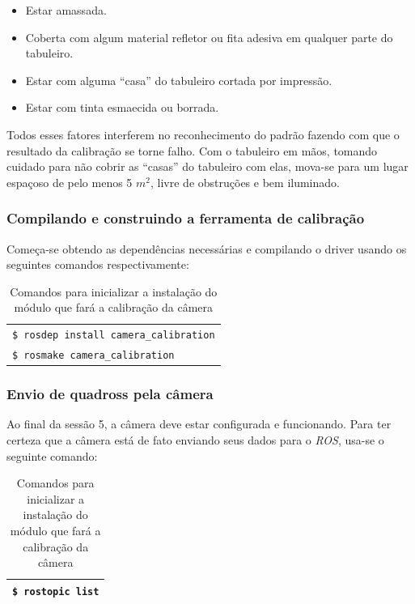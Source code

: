 \begin{itemize}
	\item{Estar amassada.}
	\item{Coberta com algum material refletor ou fita adesiva em qualquer parte do tabuleiro.}
	\item{Estar com alguma “casa” do tabuleiro cortada por impressão.}
	\item{Estar com tinta esmaecida ou borrada.}
\end{itemize}	

Todos esses fatores interferem no reconhecimento do padrão fazendo com que o resultado da calibração se torne falho. Com o tabuleiro em mãos, tomando cuidado para não cobrir as “casas” do tabuleiro com elas, mova-se para um lugar espaçoso de pelo menos 5 $m^2$, livre de obstruções e bem iluminado.

\subsubsection{Compilando e construindo a ferramenta de calibração}

Começa-se obtendo as dependências necessárias e compilando o driver usando os seguintes comandos respectivamente:

\begin{table}[!ht]\label{tb:1}
\begin{tabular}{| p{\textwidth}|}
\hline
\texttt{\$ rosdep install camera\_calibration} \\
\texttt{\$ rosmake camera\_calibration} \\ \hline
\end{tabular}
\caption{Comandos para inicializar a instalação do módulo que fará a calibração da câmera}
\end{table}


\subsubsection{Envio de quadross pela câmera}

Ao final da sessão 5, a câmera deve estar configurada e funcionando. Para ter certeza que a câmera está de fato enviando seus dados para o \textit{ROS}, usa-se o seguinte comando:

\begin{table}[!ht]\label{tb:2}
\begin{tabular}{| p{\textwidth}|}
\hline
\texttt{\$ rostopic list}\\
\hline
\end{tabular}
\caption{Comandos para inicializar a instalação do módulo que fará a calibração da câmera}
\end{table}

